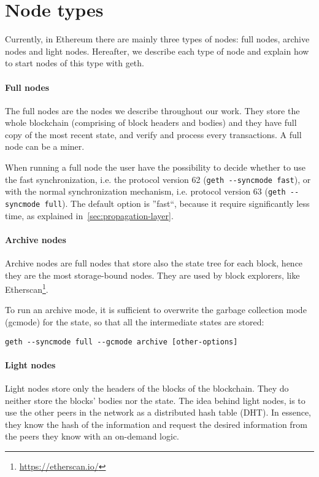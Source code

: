 \section{Node types}
\label{sec:node-types}
Currently, in Ethereum there are mainly three types of nodes: full nodes,
archive nodes and light nodes. Hereafter, we describe each type of node and
explain how to start nodes of this type with geth.

\paragraph{Full nodes}
The full nodes are the nodes we describe throughout our work. They store the
whole blockchain (comprising of block headers and bodies) and they have full
copy of the most recent state, and verify and process every transactions. A full
node can be a miner.

When running a full node the user have the possibility to decide whether to use
the fast synchronization, i.e. the protocol version 62
(\verb|geth --syncmode fast|), or with the normal synchronization mechanism,
i.e. protocol version 63 (\verb|geth --syncmode full|). The default option is
''fast``, because it require significantly less time, as explained
in~\autoref{sec:propagation-layer}.

\paragraph{Archive nodes}
Archive nodes are full nodes that store also the state tree for each block,
hence they are the most storage-bound nodes. They are used by block explorers,
like Etherscan\footnote{\url{https://etherscan.io/}}.

To run an archive mode, it is sufficient to overwrite the garbage collection
mode (gcmode) for the state, so that all the intermediate states are stored:
\begin{center}
\verb|geth --syncmode full --gcmode archive [other-options]|
\end{center}
\paragraph{Light nodes}
Light nodes store only the headers of the blocks of the blockchain. They do
neither store the blocks' bodies nor the state. The idea behind light nodes, is
to use the other peers in the network as a distributed hash table (DHT).
In essence, they know the hash of the information and request the desired
information from the peers they know with an on-demand logic.

